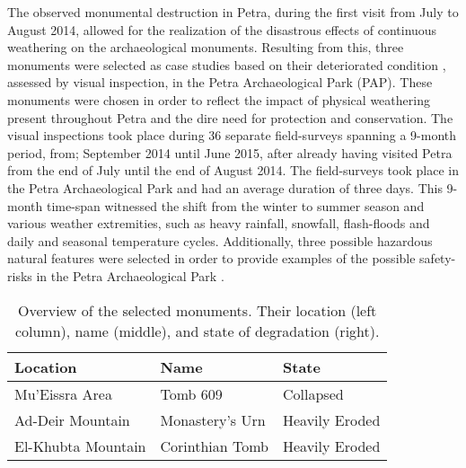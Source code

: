 The  observed monumental destruction in Petra, during the first visit from July to August 2014, allowed for the realization of the disastrous effects of continuous weathering on the archaeological monuments.
Resulting from this, three monuments were selected as case studies based on their deteriorated condition , assessed by visual inspection, in the Petra Archaeological Park (PAP).
These monuments were chosen in order to reflect the impact of physical weathering present throughout Petra and the dire need for protection and conservation.
The visual inspections took place during 36 separate field-surveys spanning a 9-month period, from; September 2014 until June 2015, after already having visited Petra from the end of July until the end of August 2014.
The field-surveys took place in the Petra Archaeological Park and had an average duration of three days.
This 9-month time-span witnessed the shift from the winter to summer season and various weather extremities, such as heavy rainfall, snowfall, flash-floods and daily and seasonal temperature cycles.
Additionally, three possible hazardous natural features were selected in order to provide examples of the possible safety-risks in the Petra Archaeological Park .

\begin{table}[!htb]
	\centering
	\caption{Overview of the selected monuments. Their location (left column), name (middle), and state of degradation (right).}
	\label{tab:Verezen-table1}
	\begin{tabular}{|l|l|l|}
		\hline
		\textbf{Location}  & \textbf{Name}   & \textbf{State} \\ \hline
		Mu’Eissra Area     & Tomb 609        & Collapsed      \\ \hline
		Ad-Deir Mountain   & Monastery's Urn & Heavily Eroded \\ \hline
		El-Khubta Mountain & Corinthian Tomb & Heavily Eroded \\ \hline
	\end{tabular}
\end{table}

